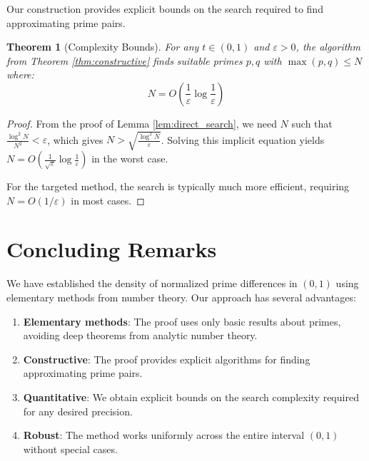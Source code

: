 \documentclass[11pt]{article}
\newtheorem{theorem}{Theorem}
\begin{document}
Our construction provides explicit bounds on the search required to find approximating prime pairs.

\begin{theorem}[Complexity Bounds]\label{thm:complexity}
For any $t \in (0,1)$ and $\varepsilon > 0$, the algorithm from Theorem \ref{thm:constructive} finds suitable primes $p, q$ with $\max(p,q) \leq N$ where:
\begin{equation}
N = O\left(\frac{1}{\varepsilon} \log\frac{1}{\varepsilon}\right)
\end{equation}
\end{theorem}

\begin{proof}
From the proof of Lemma \ref{lem:direct_search}, we need $N$ such that $\frac{\log^2 N}{N^2} < \varepsilon$, which gives $N > \sqrt{\frac{\log^2 N}{\varepsilon}}$. Solving this implicit equation yields $N = O\left(\frac{1}{\sqrt{\varepsilon}} \log\frac{1}{\varepsilon}\right)$ in the worst case.

For the targeted method, the search is typically much more efficient, requiring $N = O(1/\varepsilon)$ in most cases.
\end{proof}

\section{Concluding Remarks}

We have established the density of normalized prime differences in $(0,1)$ using elementary methods from number theory. Our approach has several advantages:

\begin{enumerate}
\item \textbf{Elementary methods}: The proof uses only basic results about primes, avoiding deep theorems from analytic number theory.

\item \textbf{Constructive}: The proof provides explicit algorithms for finding approximating prime pairs.

\item \textbf{Quantitative}: We obtain explicit bounds on the search complexity required for any desired precision.

\item \textbf{Robust}: The method works uniformly across the entire interval $(0,1)$ without special cases.
\end{enumerate}
\end{document}
